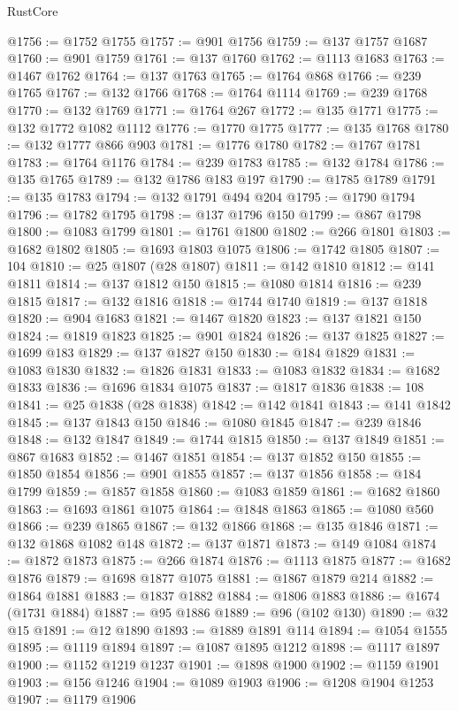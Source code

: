 \begin{lexlean}{RustCore}
\begin{coremodule}
@1756 := @1752 @1755
@1757 := @901 @1756
@1759 := @137 @1757 @1687
@1760 := @901 @1759
@1761 := @137 @1760
@1762 := @1113 @1683
@1763 := @1467 @1762
@1764 := @137 @1763
@1765 := @1764 @868
@1766 := @239 @1765
@1767 := @132 @1766
@1768 := @1764 @1114
@1769 := @239 @1768
@1770 := @132 @1769
@1771 := @1764 @267
@1772 := @135 @1771
@1775 := @132 @1772 @1082 @1112
@1776 := @1770 @1775
@1777 := @135 @1768
@1780 := @132 @1777 @866 @903
@1781 := @1776 @1780
@1782 := @1767 @1781
@1783 := @1764 @1176
@1784 := @239 @1783
@1785 := @132 @1784
@1786 := @135 @1765
@1789 := @132 @1786 @183 @197
@1790 := @1785 @1789
@1791 := @135 @1783
@1794 := @132 @1791 @494 @204
@1795 := @1790 @1794
@1796 := @1782 @1795
@1798 := @137 @1796 @150
@1799 := @867 @1798
@1800 := @1083 @1799
@1801 := @1761 @1800
@1802 := @266 @1801
@1803 := @1682 @1802
@1805 := @1693 @1803 @1075
@1806 := @1742 @1805
@1807 := 104
@1810 := @25 @1807 (@28 @1807)
@1811 := @142 @1810
@1812 := @141 @1811
@1814 := @137 @1812 @150
@1815 := @1080 @1814
@1816 := @239 @1815
@1817 := @132 @1816
@1818 := @1744 @1740
@1819 := @137 @1818
@1820 := @904 @1683
@1821 := @1467 @1820
@1823 := @137 @1821 @150
@1824 := @1819 @1823
@1825 := @901 @1824
@1826 := @137 @1825
@1827 := @1699 @183
@1829 := @137 @1827 @150
@1830 := @184 @1829
@1831 := @1083 @1830
@1832 := @1826 @1831
@1833 := @1083 @1832
@1834 := @1682 @1833
@1836 := @1696 @1834 @1075
@1837 := @1817 @1836
@1838 := 108
@1841 := @25 @1838 (@28 @1838)
@1842 := @142 @1841
@1843 := @141 @1842
@1845 := @137 @1843 @150
@1846 := @1080 @1845
@1847 := @239 @1846
@1848 := @132 @1847
@1849 := @1744 @1815
@1850 := @137 @1849
@1851 := @867 @1683
@1852 := @1467 @1851
@1854 := @137 @1852 @150
@1855 := @1850 @1854
@1856 := @901 @1855
@1857 := @137 @1856
@1858 := @184 @1799
@1859 := @1857 @1858
@1860 := @1083 @1859
@1861 := @1682 @1860
@1863 := @1693 @1861 @1075
@1864 := @1848 @1863
@1865 := @1080 @560
@1866 := @239 @1865
@1867 := @132 @1866
@1868 := @135 @1846
@1871 := @132 @1868 @1082 @148
@1872 := @137 @1871
@1873 := @149 @1084
@1874 := @1872 @1873
@1875 := @266 @1874
@1876 := @1113 @1875
@1877 := @1682 @1876
@1879 := @1698 @1877 @1075
@1881 := @1867 @1879 @214
@1882 := @1864 @1881
@1883 := @1837 @1882
@1884 := @1806 @1883
@1886 := @1674 (@1731 @1884)
@1887 := @95 @1886
@1889 := @96 (@102 @130)
@1890 := @32 @15
@1891 := @12 @1890
@1893 := @1889 @1891 @114
@1894 := @1054 @1555
@1895 := @1119 @1894
@1897 := @1087 @1895 @1212
@1898 := @1117 @1897
@1900 := @1152 @1219 @1237
@1901 := @1898 @1900
@1902 := @1159 @1901
@1903 := @156 @1246
@1904 := @1089 @1903
@1906 := @1208 @1904 @1253
@1907 := @1179 @1906

\end{coremodule}
\end{lexlean}
